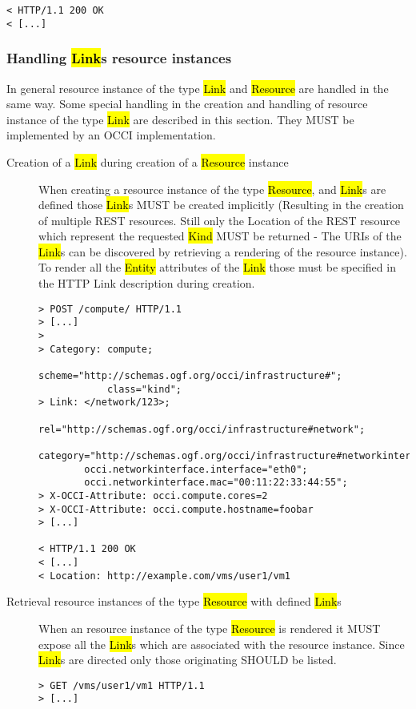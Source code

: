 \documentclass[10pt,a4paper]{article}
\begin{document}
\begin{description}
\begin{verbatim}
< HTTP/1.1 200 OK
< [...]
\end{verbatim}
\end{description}

\subsubsection{Handling \hl{Link}s resource instances}
In general resource instance of the type \hl{Link} and \hl{Resource}
are handled in the same way. Some special handling in the creation and
handling of resource instance of the type \hl{Link} are described in
this section. They MUST be implemented by an OCCI implementation.

\begin{description}
\item[Creation of a \hl{Link} during creation of a \hl{Resource}
  instance] When creating a resource instance of the type
  \hl{Resource}, and \hl{Link}s are defined those \hl{Link}s MUST be
  created implicitly (Resulting in the creation of multiple REST
  resources. Still only the Location of the REST resource which
  represent the requested \hl{Kind} MUST be returned - The URIs of the
  \hl{Link}s can be discovered by retrieving a rendering of the
  resource instance). To render all the \hl{Entity} attributes of the
  \hl{Link} those must be specified in the HTTP Link description
  during creation.
\begin{verbatim}
> POST /compute/ HTTP/1.1
> [...]
> 
> Category: compute; 
            scheme="http://schemas.ogf.org/occi/infrastructure#"; 
            class="kind"; 
> Link: </network/123>;
        rel="http://schemas.ogf.org/occi/infrastructure#network";
        category="http://schemas.ogf.org/occi/infrastructure#networkinterface";
        occi.networkinterface.interface="eth0";
        occi.networkinterface.mac="00:11:22:33:44:55";
> X-OCCI-Attribute: occi.compute.cores=2
> X-OCCI-Attribute: occi.compute.hostname=foobar
> [...]
 
< HTTP/1.1 200 OK
< [...]
< Location: http://example.com/vms/user1/vm1
\end{verbatim}

\item[Retrieval resource instances of the type \hl{Resource} with
  defined \hl{Link}s] When an resource instance of the type
  \hl{Resource} is rendered it MUST expose all the \hl{Link}s which
  are associated with the resource instance. Since \hl{Link}s are
  directed only those originating SHOULD be listed.
\begin{verbatim}
> GET /vms/user1/vm1 HTTP/1.1
> [...]
 

\end{verbatim}
\end{description}
\end{document}
